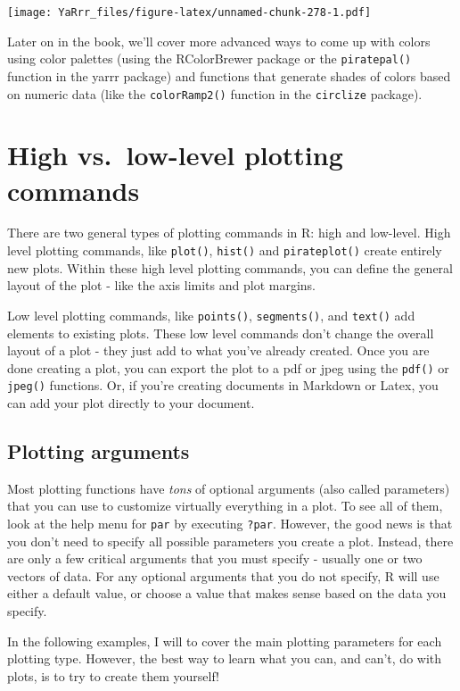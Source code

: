 \documentclass[]{book}
\theoremstyle{definition}
\theoremstyle{definition}
\theoremstyle{remark}
\begin{document}
\texttt{[image: YaRrr\_files/figure-latex/unnamed-chunk-278-1.pdf]}

Later on in the book, we'll cover more advanced ways to come up with
colors using color palettes (using the RColorBrewer package or the
\texttt{piratepal()} function in the yarrr package) and functions that
generate shades of colors based on numeric data (like the
\texttt{colorRamp2()} function in the \texttt{circlize} package).

\section{High vs.~low-level plotting
commands}\label{high-vs.low-level-plotting-commands}

There are two general types of plotting commands in R: high and
low-level. High level plotting commands, like \texttt{plot()},
\texttt{hist()} and \texttt{pirateplot()} create entirely new plots.
Within these high level plotting commands, you can define the general
layout of the plot - like the axis limits and plot margins.

Low level plotting commands, like \texttt{points()},
\texttt{segments()}, and \texttt{text()} add elements to existing plots.
These low level commands don't change the overall layout of a plot -
they just add to what you've already created. Once you are done creating
a plot, you can export the plot to a pdf or jpeg using the
\texttt{pdf()} or \texttt{jpeg()} functions. Or, if you're creating
documents in Markdown or Latex, you can add your plot directly to your
document.

\subsection{Plotting arguments}\label{plotting-arguments}

Most plotting functions have \emph{tons} of optional arguments (also
called parameters) that you can use to customize virtually everything in
a plot. To see all of them, look at the help menu for \texttt{par} by
executing \texttt{?par}. However, the good news is that you don't need
to specify all possible parameters you create a plot. Instead, there are
only a few critical arguments that you must specify - usually one or two
vectors of data. For any optional arguments that you do not specify, R
will use either a default value, or choose a value that makes sense
based on the data you specify.

In the following examples, I will to cover the main plotting parameters
for each plotting type. However, the best way to learn what you can, and
can't, do with plots, is to try to create them yourself!
\end{document}
